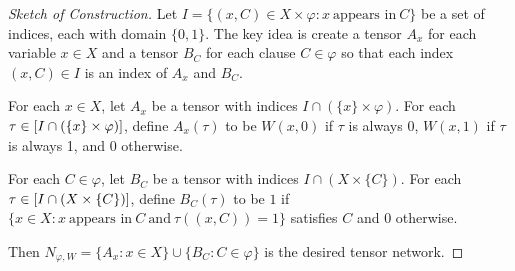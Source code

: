 \begin{proof}[Sketch of Construction] Let $I = \{(x, C) \in X \times \varphi: x~\text{appears in}~C\}$ be a set of indices, each with domain $\{0,1\}$. The key idea is create a tensor $A_x$ for each variable $x \in X$ and a tensor $B_C$ for each clause $C \in \varphi$ so that each index $(x, C) \in I$ is an index of $A_x$ and $B_C$.

For each $x \in X$, let $A_x$ be a tensor with indices $I \cap (\{x\} \times \varphi)$. For each $\tau \in [I \cap (\{x\} \times \varphi)]$, define $A_x(\tau)$ to be $W(x,0)$ if $\tau$ is always 0, $W(x, 1)$ if $\tau$ is always 1, and 0 otherwise.

For each $C \in \varphi$, let $B_C$ be a tensor with indices $I \cap (X \times \{C\})$. For each $\tau \in [I \cap (X \times \{C\})]$, define $B_C(\tau)$ to be $1$ if $\{x \in X : x~\text{appears in}~C~\text{and}~\tau((x, C)) = 1\}$ satisfies $C$ and 0 otherwise. 



Then $N_{\varphi,W} = \{A_x : x \in X\} \cup \{B_C : C \in \varphi\}$ is the desired tensor network.
\end{proof}

